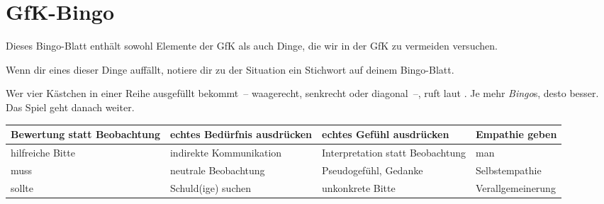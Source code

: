 \section{GfK-Bingo}

Dieses Bingo-Blatt enthält sowohl Elemente der GfK als auch Dinge, die wir in der GfK zu vermeiden versuchen.

Wenn dir eines dieser Dinge auffällt, notiere dir zu der Situation ein Stichwort auf deinem Bingo-Blatt.

Wer vier Kästchen in einer Reihe ausgefüllt bekommt~-- waagerecht, senkrecht oder diagonal~--, ruft laut . Je mehr \emph{Bingo}s, desto besser. Das Spiel geht danach weiter.

\hspace{1em}

\renewcommand{\arraystretch}{1.27}
\noindent\begin{tabular}{|p{10.0em}|p{10.0em}|p{10.0em}|p{10.0em}|}
\hline

Bewertung statt Beobachtung &
echtes Bedürfnis ausdrücken &
echtes Gefühl ausdrücken &
Empathie geben \vspace{8em} \\
\hline

hilfreiche Bitte \vspace{8em} &
indirekte Kommunikation &
Interpretation statt Beobachtung &
man \\
\hline

muss  \vspace{8em} &
neutrale Beobachtung &
Pseudogefühl, Gedanke &
Selbstempathie \\
\hline

sollte \vspace{8em} &
Schuld(ige) suchen &
unkonkrete Bitte &
Verallgemeinerung \\
\hline
\end{tabular}
\renewcommand{\arraystretch}{1.0}
